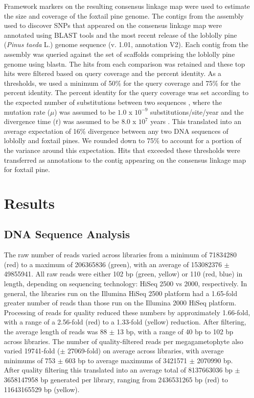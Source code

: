 \documentclass[smallextended]{svjour3}
\begin{document}
Framework markers on the resulting consensus linkage map were used to estimate the size \citep{Chakravarti:1991} and
coverage \citep{Lange:1982} of the foxtail pine genome. The contigs 
from the assembly used to discover SNPs that appeared on the consensus linkage map were annotated using BLAST tools \citep{Altschul:1990vt} 
and the most recent release of the loblolly pine (\textit{Pinus taeda} L.) genome sequence (v. 1.01, annotation V2). Each contig from the 
assembly was queried against the set of scaffolds comprising the loblolly pine genome using blastn. The hits from each comparison was 
retained and these top hits were filtered based on query coverage and the percent identity. As a thresholds, we used a minimum of 50\% for the query
coverage and 75\% for the percent identity. The percent identity for the query coverage was set according to the expected number
of substitutions between two sequences \citep[$2 \mu t$, see][]{Nei:1987}, where the mutation rate ($\mu$) was assumed to be 
$1.0$ x $10^{-9}$ substitutions/site/year and the divergence time ($t$) was assumed to be $8.0$ x $10^{7}$ years \citep{Willyard:2007}. 
This translated into an average expectation of 16\% divergence between any two DNA sequences of loblolly and foxtail pines. We rounded down to 
75\% to account for a portion of the variance around this expectation. Hits that exceeded these thresholds were transferred as annotations to the contig 
appearing on the consensus linkage map for foxtail pine. 

\section*{Results}

\subsection*{DNA Sequence Analysis}

The raw number of reads varied across libraries from a minimum of
\num{71834280} (red) to a maximum of \num{206365836} (green), with an average of \num{153082376} 
$\pm$ \num{49855941}. All raw reads were either 102 bp (green, yellow) or 110 (red, blue) in length, 
depending on sequencing technology: HiSeq 2500 vs 2000, respectively. In 
general, the libraries run on the Illumina HiSeq 2500 platform had a \num{1.65}-fold greater 
number of reads than those run on the Illumina 2000 HiSeq platform. Processing of reads 
for quality reduced these numbers by approximately \num{1.66}-fold, with a range 
of a \num{2.56}-fold (red) to a \num{1.33}-fold (yellow) reduction. After filtering, the average
length of reads was 88 $\pm$ 13 bp, with a range of 40 bp to 102 bp across libraries. 
The number of quality-filtered reads per megagametophyte also varied \num{19741}-fold ($\pm$ \num{27069}-fold) 
on average across libraries, with average minimums of 753 $\pm$ 603 bp to average maximums of 
\num{3421571} $\pm$ \num{2070990} bp. After quality filtering this translated into an average total of 
\num{8137663036} bp $\pm$ \num{3658147958} bp generated per library, ranging from 
\num{2436531265} bp (red) to \num{11643165529} bp (yellow).  
\end{document}
